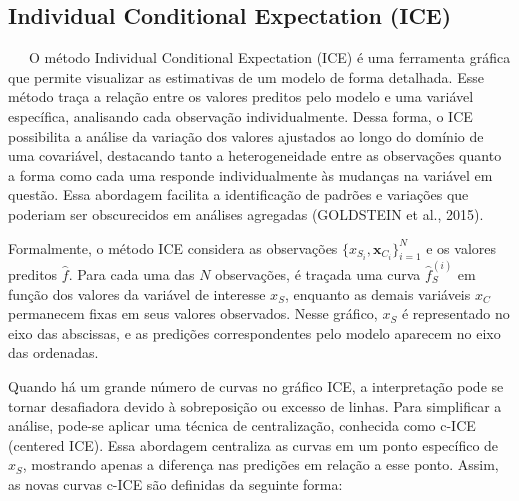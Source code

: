 \documentclass[
  12pt,
  a4paper,
]{scrreprt}
\begin{document}
\subsection{Individual Conditional Expectation
(ICE)}\label{individual-conditional-expectation-ice}

~~~O método Individual Conditional Expectation (ICE) é uma ferramenta
gráfica que permite visualizar as estimativas de um modelo de forma
detalhada. Esse método traça a relação entre os valores preditos pelo
modelo e uma variável específica, analisando cada observação
individualmente. Dessa forma, o ICE possibilita a análise da variação
dos valores ajustados ao longo do domínio de uma covariável, destacando
tanto a heterogeneidade entre as observações quanto a forma como cada
uma responde individualmente às mudanças na variável em questão. Essa
abordagem facilita a identificação de padrões e variações que poderiam
ser obscurecidos em análises agregadas (GOLDSTEIN et al., 2015).

\vspace{12pt}

Formalmente, o método ICE considera as observações
\(\{x_{S_i}, \mathbf{x}_{C_i}\}_{i=1}^{N}\)\hspace{0pt} e os valores
preditos \(\hat f\)\hspace{0pt}. Para cada uma das \(N\) observações, é
traçada uma curva \(\hat f_S^{\left(i\right)}\)\hspace{0pt} em função
dos valores da variável de interesse \(x_S\)\hspace{0pt}, enquanto as
demais variáveis \(x_C\)\hspace{0pt} permanecem fixas em seus valores
observados. Nesse gráfico, \(x_S\)\hspace{0pt} é representado no eixo
das abscissas, e as predições correspondentes pelo modelo aparecem no
eixo das ordenadas.

\vspace{12pt}

Quando há um grande número de curvas no gráfico ICE, a interpretação
pode se tornar desafiadora devido à sobreposição ou excesso de linhas.
Para simplificar a análise, pode-se aplicar uma técnica de
centralização, conhecida como c-ICE (centered ICE). Essa abordagem
centraliza as curvas em um ponto específico de \(x_S\)\hspace{0pt},
mostrando apenas a diferença nas predições em relação a esse ponto.
Assim, as novas curvas c-ICE são definidas da seguinte forma:
\end{document}
